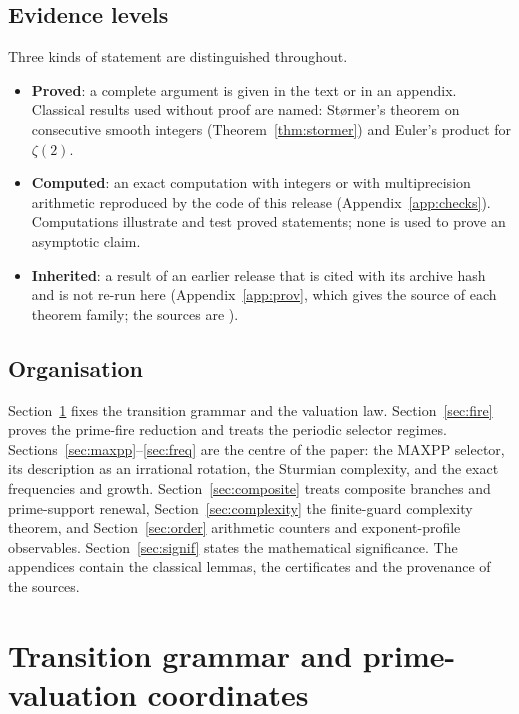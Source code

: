 \subsection{Evidence levels}\label{ssec:evidence}
Three kinds of statement are distinguished throughout.
\begin{itemize}[itemsep=1pt]
\item \textbf{Proved}: a complete argument is given in the text or in an appendix. Classical results used without proof are named: Størmer's theorem on consecutive smooth integers (Theorem~\ref{thm:stormer}) and Euler's product for $\zeta(2)$.
\item \textbf{Computed}: an exact computation with integers or with multiprecision arithmetic reproduced by the code of this release (Appendix~\ref{app:checks}). Computations illustrate and test proved statements; none is used to prove an asymptotic claim.
\item \textbf{Inherited}: a result of an earlier release that is cited with its archive hash and is not re-run here (Appendix~\ref{app:prov}, which gives the source of each theorem family; the sources are \cite{u4gen,u4genc,u4order}).
\end{itemize}

\subsection{Organisation}
Section~\ref{sec:grammar} fixes the transition grammar and the valuation law. Section~\ref{sec:fire} proves the prime-fire reduction and treats the periodic selector regimes. Sections~\ref{sec:maxpp}--\ref{sec:freq} are the centre of the paper: the \textsf{MAXPP} selector, its description as an irrational rotation, the Sturmian complexity, and the exact frequencies and growth. Section~\ref{sec:composite} treats composite branches and prime-support renewal, Section~\ref{sec:complexity} the finite-guard complexity theorem, and Section~\ref{sec:order} arithmetic counters and exponent-profile observables. Section~\ref{sec:signif} states the mathematical significance. The appendices contain the classical lemmas, the certificates and the provenance of the sources.

\section{Transition grammar and prime-valuation coordinates}\label{sec:grammar}
